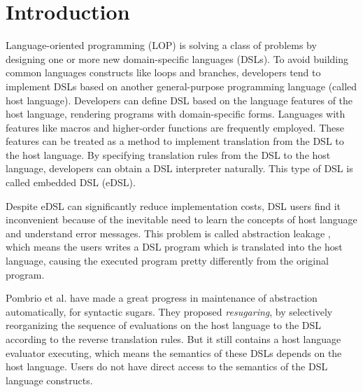 \section{Introduction}

Language-oriented programming (LOP) \cite{LOP} is solving a class of problems by designing one or more new domain-specific languages (DSLs).
To avoid building common languages constructs like loops and branches,
developers tend to implement DSLs based on another general-purpose programming language (called host language).
Developers can define DSL based on the language features of the host language, rendering programs with domain-specific forms.
Languages with features like macros and higher-order functions are frequently employed\cite{macro-dsl,macro-dsl-2}.
These features can be treated as a method to implement translation from the DSL to the host language.
By specifying translation rules from the DSL to the host language, developers can obtain a DSL interpreter naturally.
This type of DSL is called embedded DSL (eDSL).

Despite eDSL can significantly reduce implementation costs, DSL users find it inconvenient because of the inevitable need to learn the concepts of host language and understand error messages.
This problem is called abstraction leakage \cite{Abstraction},
 which means the users writes a DSL program which is translated into the host language,
 causing the executed program pretty differently from the original program.


Pombrio et al. \cite{resugar} have made a great progress in maintenance of abstraction automatically, for syntactic sugars.
They proposed \textit{resugaring}, by selectively reorganizing the sequence of evaluations on the host language to the DSL according to the reverse translation rules.
But it still contains a host language evaluator executing,
 which means the semantics of these DSLs depends on the host language.
Users do not have direct access to the semantics of the DSL language constructs.

